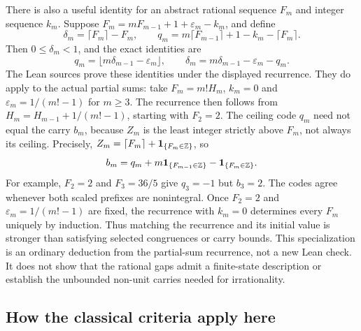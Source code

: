 \documentclass[11pt]{article}
\begin{document}
There is also a useful identity for an abstract rational sequence $F_m$
and integer sequence $k_m$. Suppose
$F_m=mF_{m-1}+1+\varepsilon_m-k_m$, and define
\[
 \delta_m=\lceil F_m\rceil-F_m,\qquad
 q_m=m\lceil F_{m-1}\rceil+1-k_m-\lceil F_m\rceil.
\]
Then $0\le\delta_m<1$, and the exact identities are
\[
 q_m=\lfloor m\delta_{m-1}-\varepsilon_m\rfloor,\qquad
 \delta_m=m\delta_{m-1}-\varepsilon_m-q_m.
\]
The Lean sources prove these identities under the displayed
recurrence. They do apply to the actual partial sums: take $F_m=m!H_m$,
$k_m=0$ and $\varepsilon_m=1/(m!-1)$ for $m\ge3$. The recurrence then
follows from $H_m=H_{m-1}+1/(m!-1)$, starting with $F_2=2$.
The ceiling code $q_m$ need not equal the carry $b_m$, because $Z_m$ is
the least integer strictly above $F_m$, not always its ceiling. Precisely,
$Z_m=\lceil F_m\rceil+\mathbf1_{\{F_m\in\mathbb{Z}\}}$, so
\[
 b_m=q_m+m\mathbf1_{\{F_{m-1}\in\mathbb{Z}\}}
          -\mathbf1_{\{F_m\in\mathbb{Z}\}}.
\]
For example, $F_2=2$ and $F_3=36/5$ give $q_3=-1$ but $b_3=2$.
The codes agree whenever both scaled prefixes are nonintegral. Once
$F_2=2$ and $\varepsilon_m=1/(m!-1)$ are fixed, the recurrence with $k_m=0$
determines every $F_m$ uniquely by induction. Thus matching the recurrence
and its initial value is stronger than satisfying selected congruences
or carry bounds. This specialization is an ordinary deduction from the
partial-sum recurrence, not a new Lean check. It does not show that the rational gaps admit a
finite-state description or establish the unbounded non-unit carries
needed for irrationality.

\subsection{How the classical criteria apply here}\label{long68:sec:ext-literature}
\end{document}
